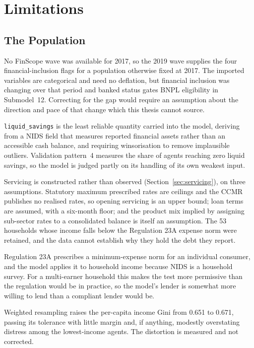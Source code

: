 \chapter{Limitations}
\label{ch:limitations}

\section{The Population}
\label{sec:lim-population}

\label{sec:lim-finscope}%
No \ac{FinScope} wave was available for 2017, so the 2019 wave supplies the four
financial-inclusion flags for a population otherwise fixed at 2017. The imported variables are
categorical and need no deflation, but financial inclusion was changing over that period and banked
status gates \ac{BNPL} eligibility in Submodel~12. Correcting for the gap would require an
assumption about the direction and pace of that change which this thesis cannot source.

\label{sec:lim-savings}%
\texttt{liquid\_savings} is the least reliable quantity carried into the model, deriving from a
\ac{NIDS} field that measures reported financial assets rather than an accessible cash balance, and
requiring winsorisation to remove implausible outliers. Validation pattern~4 measures the share of
agents reaching zero liquid savings, so the model is judged partly on its handling of its own
weakest input.

\label{sec:lim-servicing}%
Servicing is constructed rather than observed (Section~\ref{sec:servicing}), on three assumptions.
Statutory maximum prescribed rates are ceilings and the \ac{CCMR} publishes no realised rates, so
opening servicing is an upper bound; loan terms are assumed, with a six-month floor; and the
product mix implied by assigning sub-sector rates to a consolidated balance is itself an
assumption. The 53 households whose income falls below the Regulation 23A expense norm were
retained, and the data cannot establish why they hold the debt they report.

\label{sec:lim-reg23a}%
Regulation 23A prescribes a minimum-expense norm for an individual consumer, and the model applies
it to household income because \ac{NIDS} is a household survey. For a multi-earner household this
makes the test more permissive than the regulation would be in practice, so the model's lender is
somewhat more willing to lend than a compliant lender would be.

\label{sec:lim-resample}%
Weighted resampling raises the per-capita income Gini from 0.651 to 0.671, passing its tolerance
with little margin and, if anything, modestly overstating distress among the lowest-income agents.
The distortion is measured and not corrected.


